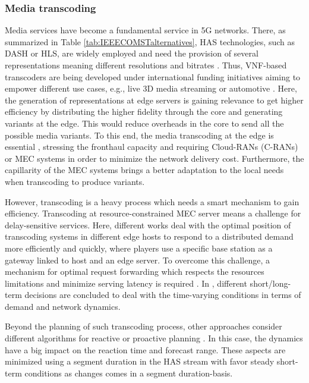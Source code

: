 \subsubsection{Media transcoding}

Media services have become a fundamental service in 5G networks. There, as summarized in Table \ref{tab:IEEECOMSTalternatives}, HAS technologies, such as DASH or HLS, are widely employed and need the provision of several representations meaning different resolutions and bitrates \cite{Liu2021}. Thus, VNF-based transcoders are being developed under international funding initiatives aiming to empower different use cases, e.g., live 3D media streaming \cite{Doumanoglou2018} or automotive \cite{vnfTranscoders}. Here, the generation of representations at edge servers is gaining relevance to get higher efficiency by distributing the higher fidelity through the core and generating variants at the edge. This would reduce overheads in the core to send all the possible media variants. To this end, the media transcoding at the edge is essential \cite{Tran2019}, stressing the fronthaul capacity and requiring Cloud-RANs (C-RANs) or MEC systems in order to minimize the network delivery cost. Furthermore, the capillarity of the MEC systems brings a better adaptation to the local needs when transcoding to produce variants.

However, transcoding is a heavy process which needs a smart mechanism to gain efficiency. Transcoding at resource-constrained MEC server means a challenge for delay-sensitive services. Here, different works deal with the optimal position of transcoding systems in different edge hosts to respond to a distributed demand more efficiently and quickly, where players use a specific base station as a gateway linked to host and an edge server. To overcome this challenge, a mechanism for optimal request forwarding which respects the resources limitations and minimize serving latency is required \cite{Rezvani2019}. In \cite{Wang2021}, different short/long-term decisions are concluded to deal with the time-varying conditions in terms of demand and network dynamics.

Beyond the planning of such transcoding process, other approaches consider different algorithms for reactive or proactive planning \cite{Tran2019}. In this case, the dynamics have a big impact on the reaction time and forecast range. These aspects are minimized using a segment duration in the HAS stream with favor steady short-term conditions as changes comes in a segment duration-basis.

